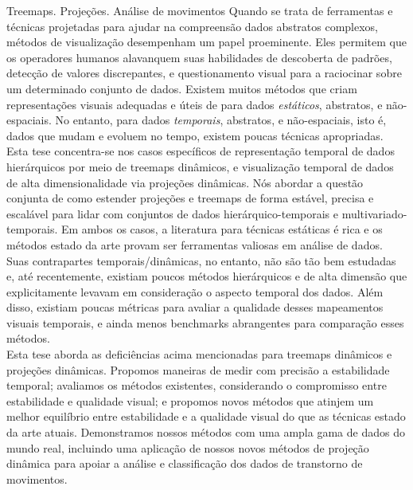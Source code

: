 \documentclass[ppgc,tese,english]{iiufrgs}
\begin{document}
\begin{englishabstract}{}{Treemaps. Projeções. Análise de movimentos}
Quando se trata de ferramentas e técnicas projetadas para ajudar na compreensão dados abstratos complexos, métodos de visualização desempenham um papel proeminente. Eles permitem que os operadores humanos alavanquem suas habilidades de descoberta de padrões, detecção de valores discrepantes, e questionamento visual para a raciocinar sobre um determinado conjunto de dados. 
Existem muitos métodos que criam representações visuais adequadas e úteis de para dados \emph{estáticos}, abstratos, e não-espaciais. No entanto, para dados \emph{temporais}, abstratos, e não-espaciais, isto é, dados que mudam e evoluem no tempo, existem poucas técnicas apropriadas.
\\
Esta tese concentra-se nos casos específicos de representação temporal de dados hierárquicos por meio de treemaps dinâmicos, e visualização temporal de dados de alta dimensionalidade via projeções dinâmicas. Nós abordar a questão conjunta de como estender projeções e treemaps de forma estável, precisa e escalável para lidar  com conjuntos de dados hierárquico-temporais e multivariado-temporais.
Em ambos os casos, a literatura para técnicas estáticas é rica e os métodos estado da arte provam ser ferramentas valiosas em análise de dados. Suas contrapartes temporais/dinâmicas, no entanto, não são tão bem estudadas e, até recentemente, existiam poucos métodos hierárquicos e de alta dimensão que explicitamente levavam em consideração o aspecto temporal dos dados. Além disso, existiam poucas métricas para avaliar a qualidade desses mapeamentos visuais temporais, e ainda menos benchmarks abrangentes para comparação esses métodos. 
\\
Esta tese aborda as deficiências acima mencionadas para treemaps dinâmicos e projeções dinâmicas. Propomos maneiras de medir com precisão a estabilidade temporal; avaliamos os métodos existentes, considerando o compromisso entre estabilidade e qualidade visual; e propomos novos métodos que atinjem um melhor equilíbrio entre estabilidade e a qualidade visual do que as técnicas estado da arte atuais. Demonstramos nossos métodos com uma ampla gama de dados do mundo real, incluindo uma aplicação de nossos novos métodos de projeção dinâmica para apoiar a análise e classificação dos dados de transtorno de movimentos.   
\end{englishabstract}
\end{document}
